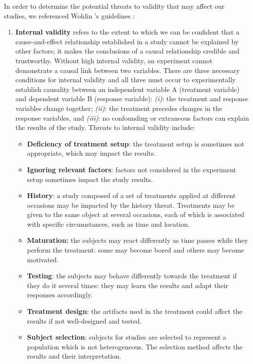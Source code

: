 In order to determine the potential threats to validity that may affect our studies, we referenced Wohlin \etal 's guidelines \cite{DBLP:books/sp/WohlinRHOR00}:
\begin{enumerate}
    \item \textbf{Internal validity} refers to the extent to which we can be confident that a cause-and-effect relationship established in a study cannot be explained by other factors; it makes the conclusions of a causal relationship credible and trustworthy. Without high internal validity, an experiment cannot demonstrate a causal link between two variables.
    There are three necessary conditions for internal validity and all three must occur to experimentally establish causality between an independent variable A (treatment variable) and dependent variable B (response variable): \textit{(i)}: the treatment and response variables change together; \textit{(ii)}: the treatment precedes changes in the response variables, and \textit{(iii)}: no confounding or extraneous factors can explain the results of the study.
    Threats to internal validity include: 
    \begin{itemize}
        \item \textbf{Deficiency of treatment setup}: the treatment setup is sometimes not appropriate, which may impact the results.
        \item \textbf{Ignoring relevant factors}: factors not considered in the experiment setup sometimes impact the study results.
        \item \textbf{History}: a study composed of a set of treatments applied at different occasions may be impacted by the history threat. Treatments may be given to the same object at several occasions, each of which is associated with specific circumstances, such as time and location.
        \item \textbf{Maturation:} the subjects may react differently as time passes while they perform the treatment: some may become bored and others may become motivated.
        \item \textbf{Testing}: the subjects may behave differently towards the treatment if they do it several times: they may learn the results and adapt their responses accordingly.
        \item \textbf{Treatment design}: the artifacts used in the treatment could affect the results if not well-designed and tested.
        \item \textbf{Subject selection}: subjects for studies are selected to represent a population which is not heterogeneous. The selection method affects the results and their interpretation.

\end{itemize}
\end{enumerate}
